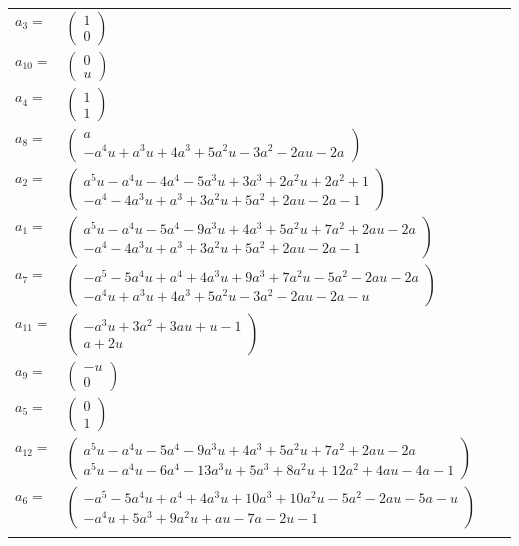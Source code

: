 \documentclass[1p]{elsarticle_modified}
\theoremstyle{definition}
\begin{document}
\begin{tabular}{m{7pt} m{180pt} m{7pt} m{180pt} }
\flushright $a_{3}=$&$\begin{pmatrix}1\\0\end{pmatrix}$ \\
\flushright $a_{10}=$&$\begin{pmatrix}0\\u\end{pmatrix}$ \\
\flushright $a_{4}=$&$\begin{pmatrix}1\\1\end{pmatrix}$ \\
\flushright $a_{8}=$&$\begin{pmatrix}a\\- a^4 u+a^3 u+4 a^3+5 a^2 u-3 a^2-2 a u-2 a\end{pmatrix}$ \\
\flushright $a_{2}=$&$\begin{pmatrix}a^5 u- a^4 u-4 a^4-5 a^3 u+3 a^3+2 a^2 u+2 a^2+1\\- a^4-4 a^3 u+a^3+3 a^2 u+5 a^2+2 a u-2 a-1\end{pmatrix}$ \\
\flushright $a_{1}=$&$\begin{pmatrix}a^5 u- a^4 u-5 a^4-9 a^3 u+4 a^3+5 a^2 u+7 a^2+2 a u-2 a\\- a^4-4 a^3 u+a^3+3 a^2 u+5 a^2+2 a u-2 a-1\end{pmatrix}$ \\
\flushright $a_{7}=$&$\begin{pmatrix}- a^5-5 a^4 u+a^4+4 a^3 u+9 a^3+7 a^2 u-5 a^2-2 a u-2 a\\- a^4 u+a^3 u+4 a^3+5 a^2 u-3 a^2-2 a u-2 a- u\end{pmatrix}$ \\
\flushright $a_{11}=$&$\begin{pmatrix}- a^3 u+3 a^2+3 a u+u-1\\a+2 u\end{pmatrix}$ \\
\flushright $a_{9}=$&$\begin{pmatrix}- u\\0\end{pmatrix}$ \\
\flushright $a_{5}=$&$\begin{pmatrix}0\\1\end{pmatrix}$ \\
\flushright $a_{12}=$&$\begin{pmatrix}a^5 u- a^4 u-5 a^4-9 a^3 u+4 a^3+5 a^2 u+7 a^2+2 a u-2 a\\a^5 u- a^4 u-6 a^4-13 a^3 u+5 a^3+8 a^2 u+12 a^2+4 a u-4 a-1\end{pmatrix}$ \\
\flushright $a_{6}=$&$\begin{pmatrix}- a^5-5 a^4 u+a^4+4 a^3 u+10 a^3+10 a^2 u-5 a^2-2 a u-5 a- u\\- a^4 u+5 a^3+9 a^2 u+a u-7 a-2 u-1\end{pmatrix}$\\&\end{tabular}
\end{document}
